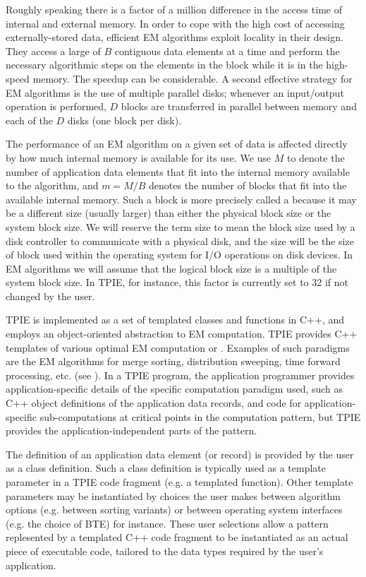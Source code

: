 Roughly speaking there is a factor of a million difference
in the access time of internal and external memory.  In
order to cope with the high cost of accessing
externally-stored data, efficient EM algorithms exploit
locality in their design.  They access a large 
of $B$ contiguous data elements at a time and perform the
necessary algorithmic steps on the elements in the block
while it is in the high-speed memory. The speedup can be
considerable.  A second effective strategy for EM algorithms
is the use of multiple parallel disks; whenever an
input/output operation is performed, $D$ blocks are
transferred in parallel between memory and each of the $D$
disks (one block per disk).

The performance of an EM algorithm on a given set of data is
affected directly by how much internal memory is available
for its use. We use $M$ to denote the number of application
data elements that fit into the internal memory available to
the algorithm, and $m=M/B$ denotes the number of blocks that
fit into the available internal memory. Such a block is more precisely
called a  because it may be a different
size (usually larger) than either the physical block size or
the system block size. We will reserve the term
 size to mean the 
block size used by a disk controller to communicate with
a physical disk, and the  size will be the
size of block used within the operating system for I/O
operations on disk devices. In EM algorithms we will assume
that the logical block size is a multiple of the system
block size. In TPIE, for instance, this factor is currently
set to 32 if not changed by the user.

TPIE is implemented as a set of templated classes and
functions in C++, and employs an object-oriented abstraction
to EM computation. TPIE provides C++ templates of various
optimal EM computation  or .
Examples of such paradigms are the EM algorithms for merge
sorting, distribution sweeping, time forward processing,
etc. (see \cite{vitter:dimacssurvey}). In a TPIE program, the
application programmer provides application-specific details
of the specific computation paradigm used, such as C++
object definitions of the application data records, and code
for application-specific sub-computations at critical points
in the computation pattern, but TPIE provides the
application-independent parts of the pattern.  

The definition of an application data element (or record) is
provided by the user as a class definition.  Such a class
definition is typically used as a template parameter in a
TPIE code fragment (e.g. a templated function). Other
template parameters may be instantiated by choices the user
makes between algorithm options (e.g. between sorting
variants) or between operating system interfaces (e.g. the
choice of BTE) for instance. These user selections allow a
pattern replesented by a templated C++ code fragment to be
instantiated as an actual piece of executable code, tailored
to the data types required by the user's application.

